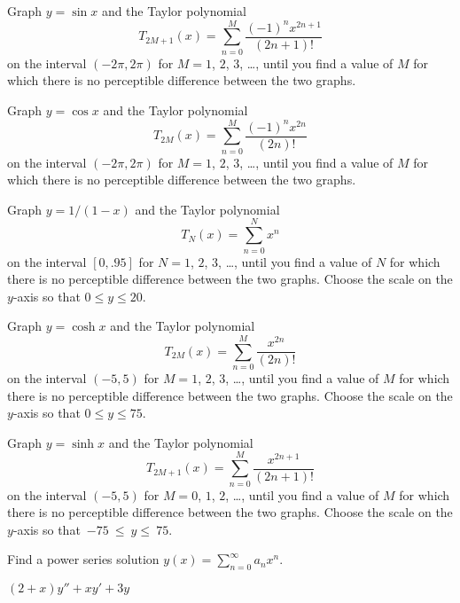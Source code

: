 \documentclass{ximera}
\begin{document}
\begin{problem}\label{exer:7.1.6}  
Graph $y=\sin x$ and the Taylor polynomial
$$
T_{2M+1}(x)=\sum_{n=0}^M\frac{(-1)^nx^{2n+1}}{(2n+1)!}
$$
on the interval $(-2\pi,2\pi)$ for $M=1$, $2$, $3$, \dots, until you find
a value of $M$ for which there is no perceptible difference between the
two graphs.

\end{problem}


\begin{problem}\label{exer:7.1.7}  
Graph $y=\cos x$ and the Taylor polynomial
$$
T_{2M}(x)=\sum_{n=0}^M\frac{(-1)^nx^{2n}}{(2n)!}
$$
on the interval $(-2\pi,2\pi)$ for $M=1$, $2$, $3$, \dots, until you find a
value of $M$ for which there is no perceptible difference between the
two graphs.
\end{problem}

\begin{problem}\label{exer:7.1.8}  
Graph $y=1/(1-x)$ and the Taylor polynomial
$$
T_N(x)=\sum_{n=0}^Nx^n
$$
on the interval $[0,.95]$ for $N=1$, $2$, $3$, \dots, until you find a
value of $N$ for which there is no perceptible difference between the
two graphs. Choose the scale on the $y$-axis so that $0\le y\le20$.
\end{problem}

\begin{problem}\label{exer:7.1.9}  
Graph $y=\cosh x$ and the Taylor polynomial
$$
T_{2M}(x)=\sum_{n=0}^M\frac{x^{2n}}{(2n)!}
$$
on the interval $(-5,5)$ for $M=1$, $2$, $3$, \dots, until you find a
value of $M$ for which there is no perceptible difference between the
two graphs.
 Choose the scale on the $y$-axis so that $0\le y\le75$.
\end{problem}

\begin{problem}\label{exer:7.1.10}  
Graph $y=\sinh x$ and the Taylor polynomial
$$
T_{2M+1}(x)=\sum_{n=0}^M\frac{x^{2n+1}}{(2n+1)!}
$$
on the interval $(-5,5)$ for $M=0$, $1$, $2$, \dots, until you find a
value of $M$ for which there is no perceptible difference between the
two graphs.  Choose the scale on the $y$-axis so that~$-75~\le~y\le~75$.
 \end{problem}

\begin{problem}\label{exer:7.1.11}
Find a power series solution $y(x)=\sum_{n=0}^\infty a_nx^n$.

$(2+x)y''+xy'+3y$
\end{problem}
\end{document}
